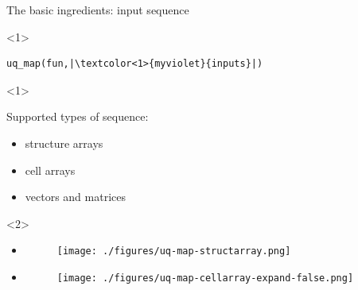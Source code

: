 \documentclass[]{rsuqbeamernew}
\begin{document}
\begin{frame}[fragile]{The basic ingredients: input sequence}

\begin{onlyenv}<1>
\begin{lstlisting}[basicstyle=\large,numbers=none]
uq_map(fun,|\textcolor<1>{myviolet}{inputs}|)
\end{lstlisting}
\end{onlyenv}
    
\begin{onlyenv}<1>
\begin{block}{Supported types of  sequence:}
\begin{itemize}
  \item structure arrays
  \item cell arrays
  \item vectors and matrices
\end{itemize}
\end{block}
\end{onlyenv}

\begin{onlyenv}<2>
  \begin{itemize}
    \item {}
    \begin{figure}
      \texttt{[image: ./figures/uq-map-structarray.png]}
    \end{figure}
    \item {}
    \begin{figure}
      \texttt{[image: ./figures/uq-map-cellarray-expand-false.png]}
    \end{figure}
  \end{itemize}
\end{onlyenv}
    


\end{frame}
\end{document}
